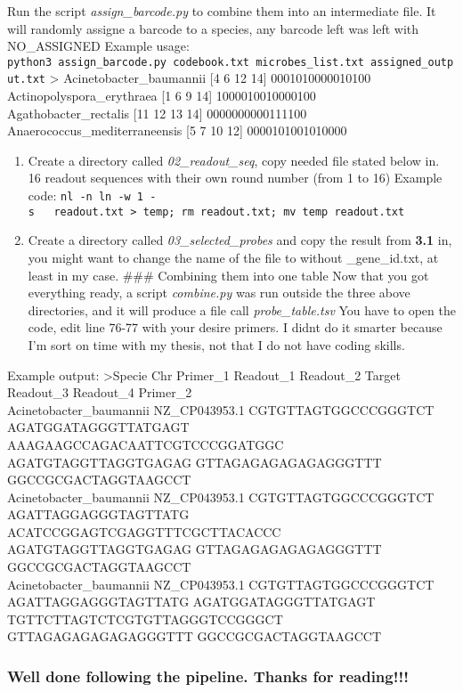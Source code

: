 \documentclass[
]{article}
\begin{document}
Run the script \emph{assign\_barcode.py} to combine them into an
intermediate file. It will randomly assigne a barcode to a species, any
barcode left was left with NO\_ASSIGNED Example usage:
\texttt{python3\ assign\_barcode.py\ codebook.txt\ microbes\_list.txt\ assigned\_output.txt}
\textgreater{} Acinetobacter\_baumannii {[}4 6 12 14{]}
0001010000010100\\
Actinopolyspora\_erythraea {[}1 6 9 14{]} 1000010010000100\\
Agathobacter\_rectalis {[}11 12 13 14{]} 0000000000111100\\
Anaerococcus\_mediterraneensis {[}5 7 10 12{]} 0000101001010000

\begin{enumerate}
\def\labelenumi{\arabic{enumi}.}
\setcounter{enumi}{1}
\item
  Create a directory called \emph{02\_readout\_seq}, copy needed file
  stated below in.\\
  16 readout sequences with their own round number (from 1 to 16)
  Example code:
  \texttt{nl\ -n\ ln\ -w\ 1\ -s\ \textquotesingle{}\ \textquotesingle{}\ readout.txt\ \textgreater{}\ temp;\ rm\ readout.txt;\ mv\ temp\ readout.txt}
\item
  Create a directory called \emph{03\_selected\_probes} and copy the
  result from \textbf{3.1} in, you might want to change the name of the
  file to without \_gene\_id.txt, at least in my case. \#\#\# Combining
  them into one table Now that you got everything ready, a script
  \emph{combine.py} was run outside the three above directories, and it
  will produce a file call \emph{probe\_table.tsv} You have to open the
  code, edit line 76-77 with your desire primers. I didnt do it smarter
  because I'm sort on time with my thesis, not that I do not have coding
  skills.
\end{enumerate}

Example output: \textgreater Specie Chr Primer\_1 Readout\_1 Readout\_2
Target Readout\_3 Readout\_4 Primer\_2\\
Acinetobacter\_baumannii NZ\_CP043953.1 CGTGTTAGTGGCCCGGGTCT
AGATGGATAGGGTTATGAGT AAAGAAGCCAGACAATTCGTCCCGGATGGC AGATGTAGGTTAGGTGAGAG
GTTAGAGAGAGAGAGGGTTT GGCCGCGACTAGGTAAGCCT\\
Acinetobacter\_baumannii NZ\_CP043953.1 CGTGTTAGTGGCCCGGGTCT
AGATTAGGAGGGTAGTTATG ACATCCGGAGTCGAGGTTTCGCTTACACCC AGATGTAGGTTAGGTGAGAG
GTTAGAGAGAGAGAGGGTTT GGCCGCGACTAGGTAAGCCT\\
Acinetobacter\_baumannii NZ\_CP043953.1 CGTGTTAGTGGCCCGGGTCT
AGATTAGGAGGGTAGTTATG AGATGGATAGGGTTATGAGT TGTTCTTAGTCTCGTGTTAGGGTCCGGGCT
GTTAGAGAGAGAGAGGGTTT GGCCGCGACTAGGTAAGCCT

\subsubsection{Well done following the pipeline. Thanks for
reading!!!}\label{well-done-following-the-pipeline.-thanks-for-reading}
\end{document}
